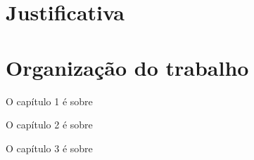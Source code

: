 \section{Justificativa}


\section{Organização do trabalho}

O capítulo 1 é sobre

O capítulo 2 é sobre

O capítulo 3 é sobre